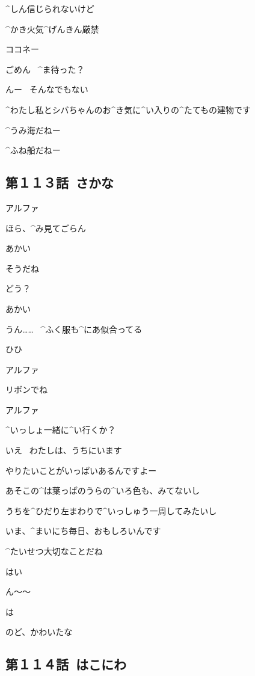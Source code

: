 \Kokone ^{しん}{信}じられないけど

\page
\Sign ^{かき}{火気}^{げんきん}{厳禁}

\Shiba ココネー

\page
\Kokone ごめん
\ ^{ま}{待}った？

\Shiba んー
\ そんなでもない

\Kokone ^{わたし}{私}とシバちゃんのお^{き}{気}に^{い}{入}りの^{たてもの}{建物}です

\page
\Shiba ^{うみ}{海}だねー

\Kokone ^{ふね}{船}だねー


\subsection{第１１３話\ さかな}

\page[32]
\Person アルファ

\page
\Person ほら、^{み}{見}てごらん

\Alpha あかい

\Person そうだね

\page[35]
\Person どう？

\Alpha あかい

\Person うん……
\ ^{ふく}{服}も^{にあ}{似合}ってる

\Alpha ひひ

\page[37]
\Person アルファ

\Person リボンでね

\page[39]
\Person アルファ

\page
\Person ^{いっしょ}{一緒}に^{い}{行}くか？

\Alpha いえ
\ わたしは、うちにいます

\page
\Alpha やりたいことがいっぱいあるんですよー

\Alpha あそこの^{は}{葉}っぱのうらの^{いろ}{色}も、みてないし

\Alpha うちを^{ひだり}{左}まわりで^{いっしゅう}{一周}してみたいし

\Alpha いま、^{まいにち}{毎日}、おもしろいんです

\Person ^{たいせつ}{大切}なことだね

\Alpha はい

\page[43]
\Alpha ん〜〜

\Alpha は

\page
\Alpha のど、かわいたな


\subsection{第１１４話\ はこにわ}

